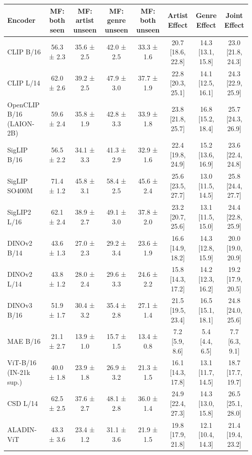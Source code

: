 \begin{tabular}{lccccccc}
\toprule
Encoder & MF: both seen & MF: artist unseen & MF: genre unseen & MF: both unseen & Artist Effect & Genre Effect & Joint Effect \\
\midrule
CLIP B/16 & 56.3 ± 2.3 & 35.6 ± 2.5 & 42.0 ± 2.5 & 33.3 ± 1.6 & 20.7 [18.6, 22.8] & 14.3 [13.1, 15.8] & 23.0 [21.8, 24.3] \\
CLIP L/14 & 62.0 ± 2.6 & 39.2 ± 2.5 & 47.9 ± 3.0 & 37.7 ± 1.9 & 22.8 [20.3, 25.1] & 14.1 [12.5, 16.1] & 24.3 [22.9, 25.9] \\
OpenCLIP B/16 (LAION-2B) & 59.6 ± 2.4 & 35.8 ± 1.9 & 42.8 ± 3.3 & 33.9 ± 1.8 & 23.8 [21.8, 25.7] & 16.8 [15.2, 18.4] & 25.7 [24.3, 26.9] \\
SigLIP B/16 & 56.5 ± 2.2 & 34.1 ± 3.3 & 41.3 ± 2.9 & 32.9 ± 1.6 & 22.4 [19.8, 24.9] & 15.2 [13.6, 16.9] & 23.6 [22.4, 24.8] \\
SigLIP SO400M & 71.4 ± 1.2 & 45.8 ± 3.1 & 58.4 ± 2.5 & 45.6 ± 2.4 & 25.6 [23.5, 27.7] & 13.0 [11.5, 14.5] & 25.8 [24.4, 27.7] \\
SigLIP2 L/16 & 62.1 ± 2.4 & 38.9 ± 2.7 & 49.1 ± 3.0 & 37.8 ± 2.0 & 23.2 [20.7, 25.6] & 13.1 [11.5, 15.0] & 24.4 [22.8, 25.9] \\
DINOv2 B/14 & 43.6 ± 1.3 & 27.0 ± 2.3 & 29.2 ± 3.4 & 23.6 ± 1.9 & 16.6 [14.9, 18.2] & 14.3 [12.8, 15.9] & 20.0 [19.0, 20.9] \\
DINOv2 L/14 & 43.8 ± 1.2 & 28.0 ± 2.4 & 29.6 ± 3.3 & 24.6 ± 2.2 & 15.8 [14.3, 17.2] & 14.2 [12.3, 16.2] & 19.2 [17.9, 20.5] \\
DINOv3 B/16 & 51.9 ± 1.7 & 30.4 ± 3.2 & 35.4 ± 2.8 & 27.1 ± 1.4 & 21.5 [19.5, 23.4] & 16.5 [15.1, 18.1] & 24.8 [24.0, 25.6] \\
MAE B/16 & 21.1 ± 2.7 & 13.9 ± 1.0 & 15.7 ± 1.5 & 13.4 ± 0.8 & 7.2 [5.9, 8.6] & 5.4 [4.4, 6.5] & 7.7 [6.3, 9.1] \\
ViT-B/16 (IN-21k sup.) & 40.0 ± 1.8 & 23.9 ± 1.8 & 26.9 ± 3.2 & 21.3 ± 1.5 & 16.1 [14.3, 17.8] & 13.1 [11.7, 14.5] & 18.7 [17.7, 19.7] \\
CSD L/14 & 62.5 ± 2.5 & 37.6 ± 2.7 & 48.1 ± 2.8 & 36.0 ± 1.4 & 24.9 [22.4, 27.3] & 14.3 [13.0, 15.8] & 26.5 [25.1, 28.0] \\
ALADIN-ViT & 43.3 ± 3.6 & 23.4 ± 1.2 & 31.1 ± 3.6 & 21.9 ± 1.5 & 19.8 [17.9, 21.8] & 12.1 [10.4, 14.3] & 21.4 [19.4, 23.2] \\
\bottomrule
\end{tabular}
